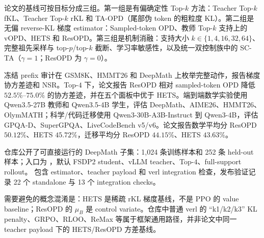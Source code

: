 论文的基线可按目标分成三组。第一组是有偏确定性 Top-$k$ 方法：Teacher Top-$k$ fKL、Teacher Top-$k$ rKL 和 TA-OPD（尾部伪 token 的粗粒度 KL）。第二组是无偏 reverse-KL 梯度 estimator：Sampled-token OPD、教师 Top-$k$ 支持上的 vOPD、HETS 和 ResOPD。第三组是机制消融：支持大小 $k\in\{1,4,16,32,64\}$、完整祖先采样与 top-$p$/top-$k$ 截断、学习率敏感性，以及统一双控制族中的 SC-TA（$\gamma=1$；ResOPD 为 $\gamma=0$）。

冻结 prefix 审计在 GSM8K、HMMT26 和 DeepMath 上枚举完整动作，报告梯度协方差迹和 NSR。Top-$4$ 下，论文报告 ResOPD 相对 sampled-token OPD 降低 $52.5\%$--$75.0\%$ 的协方差迹，并在五个面板中优于 HETS。端到端数学实验使用 Qwen3.5-27B 教师和 Qwen3.5-4B 学生，评估 DeepMath、AIME26、HMMT26、OlymMATH；科学/代码迁移使用 Qwen3-30B-A3B-Instruct 到 Qwen3-4B，评估 GPQA-D、SuperGPQA、LiveCodeBench v5/v6。论文报告数学平均分 ResOPD $50.12\%$、HETS $45.72\%$，迁移平均分 ResOPD $44.15\%$、HETS $43.63\%$。

仓库公开了可直接运行的 DeepMath 子集：1,024 条训练样本和 252 条 held-out 样本；入口为 ，默认 FSDP2 student、vLLM teacher、Top-$4$、full-support rollout。 包含 estimator、teacher payload 和 verl integration 检查，发布验证记录 22 个 standalone 与 13 个 integration checks。

需要避免的概念混淆是：HETS 是稀疏 rKL 梯度基线，不是 PPO 的 value baseline；ResOPD 的 $\mu_B$ 是 control variate。仓库中普通 verl 的 ``k1/k2/k3'' KL penalty、GRPO、RLOO、ReMax 等属于框架通用路径，并非论文中同一 teacher payload 下的 HETS/ResOPD 方差基线。
